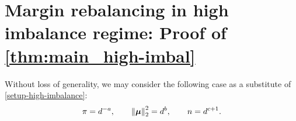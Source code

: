 \section{Margin rebalancing in high imbalance regime: Proof of \cref{thm:main_high-imbal}}
\label{append_sec:high_imb}

Without loss of generality, we may consider the following case as a substitute of \cref{setup-high-imbalance}:
\begin{equation*}
\pi = d^{-a}, \qquad \left\|{{\boldsymbol{\mu}}}\right\|_2^2 = d^b, \qquad n = d^{c+1}.
\end{equation*}

